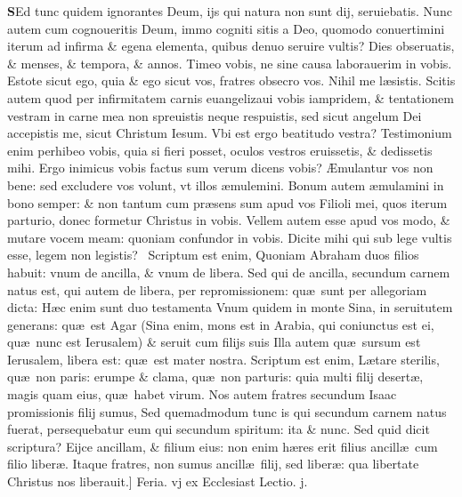 \documentclass[a5paper,10pt]{book}
\def\leftmarginnote{%
	\lrmarginnote{\hskip -\marginparsep \hskip -6.5em}}
\def\rightmarginnote{%
	\lrmarginnote{\hskip\columnwidth \hskip -1em}}
\def\ae{æ}
\def\AE{Æ}
\begin{document}
\begin{multicols*}{2}
\lettrine[lines=2]{\bfseries S}{}Ed\rightmarginnote{ca. 4.} tunc quidem ignorantes Deum, ijs qui natura non sunt dij, seruiebatis. Nunc autem cum
cognoueritis Deum, immo cogniti sitis a Deo, quomodo conuertimini iterum ad infirma \& egena elementa, quibus denuo seruire vultis? Dies obseruatis, \& menses, \& tempora, \& annos.
Timeo vobis, ne sine causa laborauerim in vobis. Estote sicut ego, quia \& ego sicut vos, fratres obsecro vos.
Nihil me l\ae sistis. Scitis autem quod per infirmitatem carnis euangelizaui vobis iampridem, \& tentationem vestram in carne mea non spreuistis neque respuistis, sed sicut angelum Dei accepistis me, sicut Christum Iesum.
Vbi est ergo beatitudo vestra? Testimonium enim perhibeo vobis, quia si fieri posset, oculos vestros eruissetis, \& dedissetis mihi.
Ergo inimicus vobis factus sum verum dicens vobis? \AE mulantur vos non bene: sed excludere vos volunt, vt illos \ae mulemini.
Bonum autem \ae mulamini in bono semper: \& non tantum cum pr\ae sens sum apud vos Filioli mei, quos iterum parturio, donec formetur Christus in vobis. Vellem autem esse apud vos modo, \& mutare vocem meam: quoniam confundor in vobis.
Dicite mihi qui sub lege vultis esse, legem non legistis? \textdagger \ 
Scriptum\leftmarginnote{\begin{flushright}C\end{flushright}} est enim, Quoniam Abraham duos filios habuit: vnum de ancilla, \& vnum de libera.
Sed qui de ancilla, secundum carnem natus est, qui autem de libera, per repromissionem: qu\ae \ sunt per allegoriam dicta: H\ae c enim sunt duo testamenta Vnum quidem in monte Sina, in seruitutem generans: qu\ae \ est Agar (Sina enim, mons est in Arabia, qui coniunctus est ei, qu\ae \ nunc est Ierusalem) \& seruit cum filijs suis
Illa autem qu\ae \ sursum est Ierusalem, libera est: qu\ae \ est mater nostra. Scriptum est enim, L\ae tare sterilis, qu\ae \ non paris: erumpe \& clama, qu\ae \ non parturis: quia multi filij desert\ae , magis quam eius, qu\ae \ habet virum.
Nos autem fratres secundum Isaac promissionis filij sumus, Sed quemadmodum tunc is qui secundum carnem natus fuerat, persequebatur eum qui secundum spiritum: ita \& nunc.
Sed quid dicit scriptura? Eijce ancillam, \& filium eius: non enim h\ae res erit filius ancill\ae \ cum filio liber\ae .
Itaque fratres, non sumus ancill\ae \ filij, sed liber\ae : qua libertate Christus nos liberauit.]
\newline \textswab{C} \color{red} \hypertarget{FRI-PRIMA-VAGAN}{Feria. vj} ex Ecclesiast Lectio. j. \color{black}
\bookmark[dest=FRI-PRIMA-VAGAN]{FERIA SEXTA}

\end{multicols*}
\end{document}
